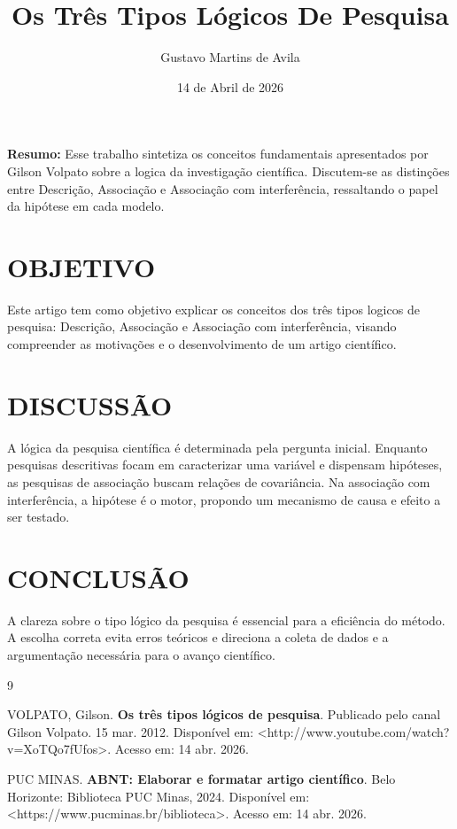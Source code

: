 \documentclass[brazil, english, a4paper, 12pt]{article}
\title{Os Três Tipos Lógicos De Pesquisa}
\author{Gustavo Martins de Avila}
\date{14 de Abril de 2026}
\begin{document}
\maketitle

\noindent \textbf{Resumo:} Esse trabalho sintetiza os conceitos fundamentais apresentados por Gilson Volpato sobre a logica da investigação científica. Discutem-se as distinções entre Descrição, Associação e Associação com interferência, ressaltando o papel da hipótese em cada modelo.

\vspace{0.5cm}

\section{OBJETIVO}
Este artigo tem como objetivo explicar os conceitos dos três tipos logicos de pesquisa: Descrição, Associação e Associação com interferência, visando compreender as motivações e o desenvolvimento de um artigo científico.

\section{DISCUSSÃO}
A lógica da pesquisa científica é determinada pela pergunta inicial. Enquanto pesquisas descritivas focam em caracterizar uma variável e dispensam hipóteses, as pesquisas de associação buscam relações de covariância. Na associação com interferência, a hipótese é o motor, propondo um mecanismo de causa e efeito a ser testado.

\section{CONCLUSÃO}
A clareza sobre o tipo lógico da pesquisa é essencial para a eficiência do método. A escolha correta evita erros teóricos e direciona a coleta de dados e a argumentação necessária para o avanço científico.

\vspace{1cm}

\renewcommand\refname{REFERÊNCIAS}
\begin{thebibliography}{9}

VOLPATO, Gilson. \textbf{Os três tipos lógicos de pesquisa}. Publicado pelo canal Gilson Volpato. 15 mar. 2012. Disponível em: <http://www.youtube.com/watch?v=XoTQo7fUfos>. Acesso em: 14 abr. 2026.

PUC MINAS. \textbf{ABNT: Elaborar e formatar artigo científico}. Belo Horizonte: Biblioteca PUC Minas, 2024. Disponível em: <https://www.pucminas.br/biblioteca>. Acesso em: 14 abr. 2026.

\end{thebibliography}
\end{document}
